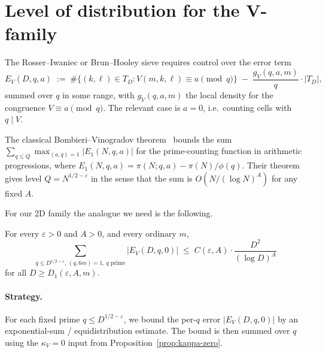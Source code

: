 %

\section{Level of distribution for the V-family}\label{sec:bv}

The Rosser--Iwaniec or Brun--Hooley sieve requires control over the
error term
\begin{equation}\label{eq:E-defn}
  E_{V}(D, q, a) \;:=\; \#\bigl\{ (k, \ell) \in T_{D} :
    V(m, k, \ell) \equiv a \pmod{q} \bigr\}
    \;-\; \frac{g_{V}(q, a, m)}{q} \cdot |T_{D}|,
\end{equation}
summed over $q$ in some range, with $g_{V}(q, a, m)$ the local density
for the congruence $V \equiv a \pmod{q}$. The relevant case is $a = 0$,
i.e.\ counting cells with $q \mid V$.

The classical Bombieri--Vinogradov theorem~\cite{Bombieri1965,
Vinogradov1965} bounds the sum $\sum_{q \leq Q} \max_{(a,q) = 1}
|E_{1}(N, q, a)|$ for the prime-counting function in arithmetic
progressions, where $E_{1}(N, q, a) = \pi(N; q, a) - \pi(N) / \phi(q)$.
Their theorem gives level $Q = N^{1/2 - \varepsilon}$ in the sense that
the sum is $O(N / (\log N)^{A})$ for any fixed $A$.

For our 2D family the analogue we need is the following.

\begin{proposition}
\label{prop:BV}
For every $\varepsilon > 0$ and $A > 0$, and every ordinary $m$,
\begin{equation}\label{eq:BV}
  \sum_{q \leq D^{1/2 - \varepsilon}, \, (q, 6m) = 1, \, q \text{ prime}}
    |E_{V}(D, q, 0)|
    \;\leq\; C(\varepsilon, A) \cdot \frac{D^{2}}{(\log D)^{A}}
\end{equation}
for all $D \geq D_{1}(\varepsilon, A, m)$.
\end{proposition}

\paragraph{Strategy.}
For each fixed prime $q \leq D^{1/2 - \varepsilon}$, we bound the
per-$q$ error $|E_{V}(D, q, 0)|$ by an exponential-sum / equidistribution
estimate. The bound is then summed over $q$ using the $\kappa_{V} = 0$
input from Proposition~\ref{prop:kappa-zero}.

